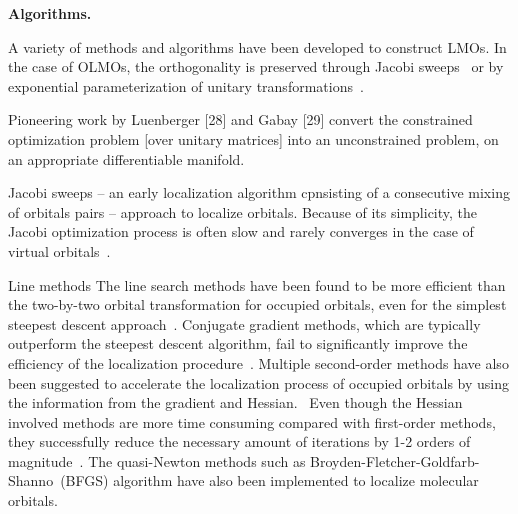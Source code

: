 \documentclass[aps,prl,reprint,amsmath,amssymb]{revtex4-1}
\begin{document}

\textbf{Algorithms.} 

A variety of methods and algorithms have been developed to construct LMOs. 
In the case of OLMOs, the orthogonality is preserved through Jacobi sweeps~\cite{edmiston1963localized, barr1975improved} or by exponential parameterization of unitary transformations~\cite{berghold2000general}. 

Pioneering work by Luenberger [28] and Gabay [29] convert the constrained optimization problem [over unitary matrices] into an unconstrained problem, on an appropriate differentiable manifold.

%
%
Jacobi sweeps -- an early localization algorithm cpnsisting of a consecutive mixing of orbitals pairs -- approach to localize orbitals. Because of its simplicity, the Jacobi optimization process is often slow and rarely converges in the case of virtual orbitals~\cite{RZK-citation-is-needed,subotnik?}. 



Line methods 
The line search methods have been found to be more efficient than the two-by-two orbital transformation for occupied orbitals, even for the simplest steepest descent approach~\cite{edmiston1965localized}.
Conjugate gradient methods, which are typically outperform the steepest descent algorithm, fail to significantly improve the efficiency of the localization procedure~\cite{ryback1978application}.
Multiple second-order methods have also been suggested to accelerate the localization process of occupied orbitals by using the information from the gradient and Hessian.~\cite{leonard1982quadratically, kari1984parametrization}
Even though the Hessian involved methods are more time consuming compared with first-order methods, they successfully reduce the necessary amount of iterations by 1-2 orders of magnitude~\citet{leonard1982quadratically}.
The quasi-Newton methods such as Broyden-Fletcher-Goldfarb-Shanno~(BFGS) algorithm have also been implemented to localize molecular orbitals.~\cite{kari1984parametrization}
\end{document}
